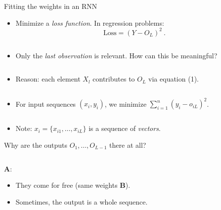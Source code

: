 \documentclass[
  10pt,
  ignorenonframetext,
]{beamer}
\providecommand{\tightlist}{%
  \setlength{\itemsep}{0pt}\setlength{\parskip}{0pt}}
\begin{document}
\begin{frame}
\begin{block}{Fitting the weights in an RNN}
\protect\hypertarget{fitting-the-weights-in-an-rnn}{}
\(~\)

\begin{itemize}
\tightlist
\item
  Minimize a \emph{loss function}. In regression problems:
  \[\text{Loss} = (Y- O_L)^2 \ . \]
\end{itemize}

\(~\)

\begin{itemize}
\tightlist
\item
  Only the \emph{last observation} is relevant. How can this be
  meaningful?
\end{itemize}

\(~\)

\begin{itemize}
\tightlist
\item
  Reason: each element \(X_l\) contributes to \(O_L\) via equation (1).
\end{itemize}

\(~\)

\begin{itemize}
\tightlist
\item
  For input sequences \((x_i,y_i)\), we minimize
  \(\sum_{i=1}^n (y_i - o_{iL})^2\).
\end{itemize}

\(~\)

\begin{itemize}
\tightlist
\item
  Note: \(x_i = \{ x_{i1}, \ldots, x_{iL} \}\) is a sequence of
  \emph{vectors}.
\end{itemize}
\end{block}
\end{frame}

\begin{frame}
Why are the outputs \(O_1, \ldots, O_{L-1}\) there at all?

\(~\)

\pause

\textbf{A}:

\begin{itemize}
\item
  They come for free (same weights \(\boldsymbol{B}\)).
\item
  Sometimes, the output is a whole sequence.
\end{itemize}
\end{frame}
\end{document}

